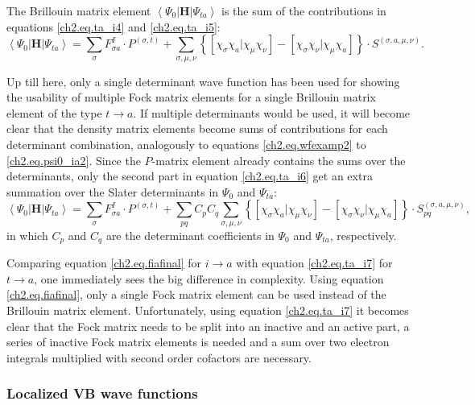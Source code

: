 The Brillouin matrix element $\left< \Psi_0 | \mathbf{H} | \Psi_{ta} \right>$ is the sum of the contributions in equations \ref{ch2.eq.ta_i4} and \ref{ch2.eq.ta_i5}:
\begin{equation}
\left< \Psi_0 | \mathbf{H} | \Psi_{ta} \right> = \sum_{\sigma} F^{I}_{\sigma a} \cdot P^{(\sigma,t)} + \sum_{\sigma,\mu,\nu} \left\{ \left[ \chi_\sigma \chi_a | \chi_\mu \chi_\nu \right] - \left[ \chi_\sigma \chi_\nu | \chi_\mu \chi_a \right] \right\} \cdot S^{(\sigma,a,\mu,\nu)}.
\label{ch2.eq.ta_i6}
\end{equation}

Up till here, only a single determinant wave function has been used for showing the usability of multiple Fock matrix elements for a single Brillouin matrix element of the type $t \rightarrow a$. If multiple determinants would be used, it will become clear that the density matrix elements become sums of contributions for each determinant combination, analogously to equations \ref{ch2.eq.wfexamp2} to \ref{ch2.eq.psi0_ia2}. Since the $P$-matrix element already contains the sums over the determinants, only the second part in equation \ref{ch2.eq.ta_i6} get an extra summation over the Slater determinants in $\Psi_0$ and $\Psi_{ta}$:
\begin{equation}
\left< \Psi_0 | \mathbf{H} | \Psi_{ta} \right> = \sum_{\sigma} F^{I}_{\sigma a} \cdot P^{(\sigma,t)} + \sum_{pq} C_p C_q\sum_{\sigma,\mu,\nu} \left\{ \left[ \chi_\sigma \chi_a | \chi_\mu \chi_\nu \right] - \left[ \chi_\sigma \chi_\nu | \chi_\mu \chi_a \right] \right\} \cdot S_{pq}^{(\sigma,a,\mu,\nu)},
\label{ch2.eq.ta_i7}
\end{equation}
in which $C_p$ and $C_q$ are the determinant coefficients in $\Psi_0$ and $\Psi_{ta}$, respectively. 

Comparing equation \ref{ch2.eq.fiafinal} for $i \rightarrow a$ with equation \ref{ch2.eq.ta_i7} for $t \rightarrow a$, one immediately sees the big difference in complexity. Using equation \ref{ch2.eq.fiafinal}, only a single Fock matrix element can be used instead of the Brillouin matrix element. Unfortunately, using equation \ref{ch2.eq.ta_i7} it becomes clear that the Fock matrix needs to be split into an inactive and an active part, a series of inactive Fock matrix elements is needed and a sum over two electron integrals multiplied with second order cofactors are necessary.

\subsubsection{\label{ch2.sec.delocal}Localized VB wave functions}


